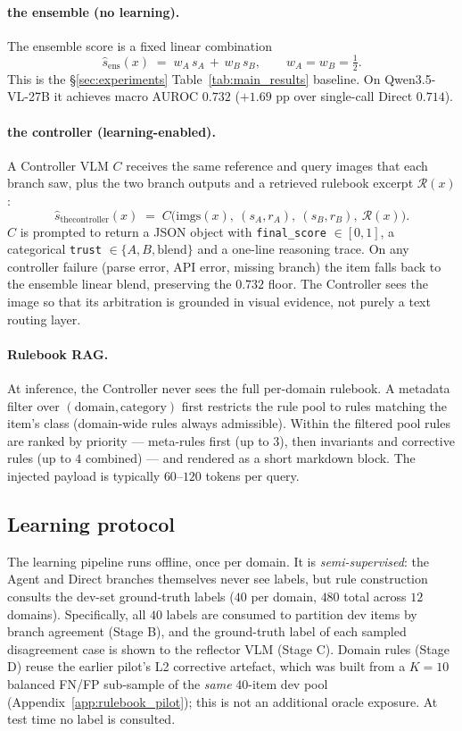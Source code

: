 \paragraph{the ensemble (no learning).} The ensemble score is a fixed linear
combination
\[
\hat{s}_{\mathrm{ens}}(x) \;=\; w_A\,s_A \,+\, w_B\,s_B, \qquad
w_A = w_B = \tfrac{1}{2}.
\]
This is the \S\ref{sec:experiments} Table~\ref{tab:main_results}
baseline. On Qwen3.5-VL-27B it achieves macro AUROC $0.732$
($+1.69$ pp over single-call Direct $0.714$).

\paragraph{the controller (learning-enabled).} A Controller VLM $C$ receives the
same reference and query images that each branch saw, plus the two
branch outputs and a retrieved rulebook excerpt $\mathcal{R}(x)$:
\[
\hat{s}_{\mathrm{the controller}}(x) \;=\; C\bigl(\mathrm{imgs}(x),\ (s_A, r_A),\ (s_B, r_B),\ \mathcal{R}(x)\bigr).
\]
$C$ is prompted to return a JSON object with \texttt{final\_score}
$\in [0,1]$, a categorical \texttt{trust} $\in\{A, B, \mathrm{blend}\}$
and a one-line reasoning trace. On any controller failure (parse
error, API error, missing branch) the item falls back to the ensemble
linear blend, preserving the $0.732$ floor. The Controller sees the
image so that its arbitration is grounded in visual evidence, not
purely a text routing layer.

\paragraph{Rulebook RAG.} At inference, the Controller never sees the
full per-domain rulebook. A metadata filter over
$(\mathrm{domain}, \mathrm{category})$ first restricts the rule pool
to rules matching the item's class (domain-wide rules always
admissible). Within the filtered pool rules are ranked by priority ---
meta-rules first (up to $3$), then invariants and corrective rules
(up to $4$ combined) --- and rendered as a short markdown block. The
injected payload is typically $60$--$120$ tokens per query.

\subsection{Learning protocol}
\label{ssec:ctrl_protocol}

The learning pipeline runs offline, once per domain. It is
\emph{semi-supervised}: the Agent and Direct branches themselves never
see labels, but rule construction consults the dev-set ground-truth
labels ($40$ per domain, $480$ total across $12$ domains). Specifically,
all $40$ labels are consumed to partition dev items by branch
agreement (Stage B), and the ground-truth label of each sampled
disagreement case is shown to the reflector VLM (Stage C). Domain
rules (Stage D) reuse the earlier pilot's L2 corrective artefact,
which was built from a $K{=}10$ balanced FN/FP sub-sample of the
\emph{same} $40$-item dev pool (Appendix~\ref{app:rulebook_pilot});
this is not an additional oracle exposure. At test time no label
is consulted.

